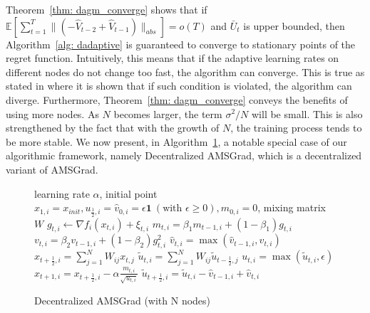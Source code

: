 \documentclass{article} %
\begin{document}
Theorem~\ref{thm: dagm_converge} shows that if $\mathbb E [ \sum_{t=1}^{T} \|(- \hat V_{t-2} + \hat V_{t-1} ) \|_{abs} ]  = o(T)$ and $\bar U_t$ is upper bounded, then Algorithm~\ref{alg: dadaptive} is guaranteed to converge to stationary points of the regret function. 
Intuitively, this means that if the adaptive learning rates on different nodes do not change too fast, the algorithm can converge. 
This is true as stated in \citep{chen2018convergence} where it is shown that if such condition is violated, the algorithm can diverge. 
Furthermore, Theorem~\ref{thm: dagm_converge} conveys the benefits of using more nodes. 
As $N$ becomes larger, the term $\sigma^2/N$ will be small. 
This is also strengthened by the fact that with the growth of $N$, the training process tends to be more stable. 
We now present, in Algorithm~\ref{alg: damsgrad}, a notable special case of our algorithmic framework, namely Decentralized AMSGrad, which is a decentralized variant of AMSGrad.

\begin{figure}\vspace{-0.15in}
\begin{minipage}{\linewidth}
\begin{algorithm}[H]
	\caption{Decentralized AMSGrad (with N nodes)}
	\label{alg: damsgrad}
	\begin{algorithmic}[1]
		 learning rate $\alpha$, initial point $x_{1,i} = x_{init}, u_{\frac{1}{2},i} = \hat v_{0,i} = \epsilon \mathbf 1\ (\text{with } \epsilon \geq 0), m_{0,i}=0$, mixing matrix $W$ 
		\STATE  $g_{t,i}  \leftarrow \nabla f_i(x_{t,i}) + \xi_{t,i}$
		\STATE $m_{t,i} = \beta_1 m_{t-1,i} + (1-\beta_1) g_{t,i}$ 
		\STATE $ v_{t,i} = \beta_2 v_{t-1,i} + (1-\beta_2) g_{t,i}^2 $
		\STATE $\hat v_{t,i} = \max (\hat v_{t-1,i}, v_{t,i} )$
		\STATE $x_{t+\frac{1}{2},i} = \sum_{j=1}^N W_{ij}x_{t,j}$
		\STATE $\tilde u_{t,i} = \sum_{j=1}^N W_{ij}\tilde u_{t-\frac{1}{2},j}$
	    \STATE $u_{t,i} = \max(\tilde u_{t,i}, \epsilon)$
		\STATE $x_{t+1,i} = x_{t+\frac{1}{2},i} - \alpha \frac{m_{t,i}}{\sqrt{u_{t,i}}}$
		\STATE $\tilde u_{t+\frac{1}{2},i} = \tilde u_{t,i} - \hat v_{t-1,i} + \hat v_{t,i}$
		\ENDFAP
		\ENDFOR
	\end{algorithmic}
\end{algorithm}\vspace{-0.1in}
\end{minipage}\end{figure}
\end{document}
